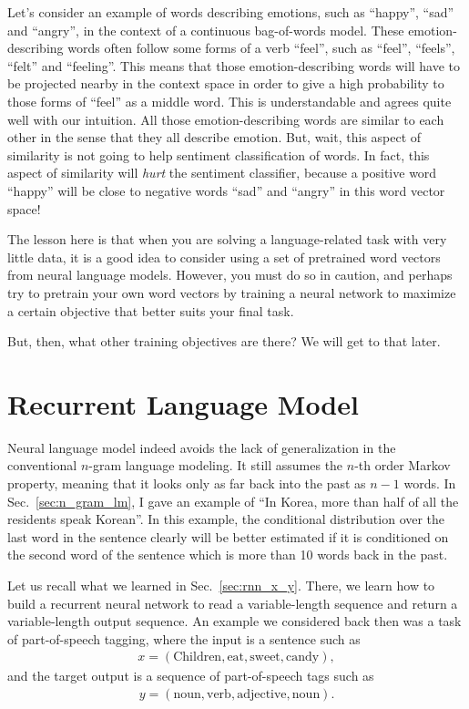 \documentclass{report}
\begin{document}
Let's consider an example of words describing emotions, such as ``happy'',
``sad'' and ``angry'', in the context of a continuous bag-of-words model. These
emotion-describing words often follow some forms of a verb ``feel'', such as
``feel'', ``feels'', ``felt'' and ``feeling''. This means that those
emotion-describing words will have to be projected nearby in the context space
in order to give a high probability to those forms of ``feel'' as a middle word.
This is understandable and agrees quite well with our intuition. All those
emotion-describing words are similar to each other in the sense that they all
describe emotion. But, wait, this aspect of similarity is not going to help
sentiment classification of words. In fact, this aspect of similarity will {\em
hurt} the sentiment classifier, because a positive word ``happy'' will be close
to negative words ``sad'' and ``angry'' in this word vector space!

The lesson here is that when you are solving a language-related task with very
little data, it is a good idea to consider using a set of pretrained word
vectors from neural language models. However, you must do so in caution, and
perhaps try to pretrain your own word vectors by training a neural network to
maximize a certain objective that better suits your final task.

But, then, what other training objectives are there? We will get to that later.

\section{Recurrent Language Model}
\label{sec:rlm}

Neural language model indeed avoids the lack of generalization in the
conventional $n$-gram language modeling. It still assumes the $n$-th order
Markov property, meaning that it looks only as far back into the past as $n-1$
words. In Sec.~\ref{sec:n_gram_lm}, I gave an example of ``In Korea, more than
half of all the residents speak Korean''. In this example, the conditional
distribution over the last word in the sentence clearly will be better estimated
if it is conditioned on the second word of the sentence which is more than 10
words back in the past.

Let us recall what we learned in Sec.~\ref{sec:rnn_x_y}. There, we learn how to
build a recurrent neural network to read a variable-length sequence and return a
variable-length output sequence. An example we considered back then was a task
of part-of-speech tagging, where the input is a sentence such as
\begin{align*}
    x = (\text{Children}, \text{eat}, \text{sweet}, \text{candy}),
\end{align*}
and the target output is a sequence of part-of-speech tags such as
\begin{align*}
    y = (\text{noun}, \text{verb}, \text{adjective}, \text{noun}).
\end{align*}
\end{document}
